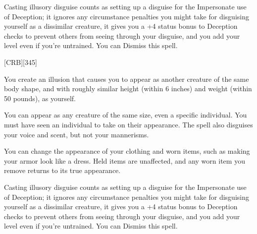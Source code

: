 Casting illusory disguise counts as setting up a disguise for the Impersonate use of Deception;
it ignores any circumstance penalties you might take for disguising yourself as a dissimilar creature,
it gives you a +4 status bonus to Deception checks to prevent others from seeing through your disguise,
and you add your level even if you're untrained.
You can Dismiss this spell.

\egroup


[CRB][345]



\bgroup
\engschrift\small

You create an illusion that causes you to appear as another creature of the same body shape,
and with roughly similar height (within 6 inches) and weight (within 50 pounds), as yourself.

You can appear as any creature of the same size, even a specific individual.
You must have seen an individual to take on their appearance.
The spell also disguises your voice and scent, but not your mannerisms.

You can change the appearance of your clothing and worn items, such as making your armor look like a dress.
Held items are unaffected, and any worn item you remove returns to its true appearance.

Casting illusory disguise counts as setting up a disguise for the Impersonate use of Deception;
it ignores any circumstance penalties you might take for disguising yourself as a dissimilar creature,
it gives you a +4 status bonus to Deception checks to prevent others from seeing through your disguise,
and you add your level even if you're untrained.
You can Dismiss this spell.

\egroup